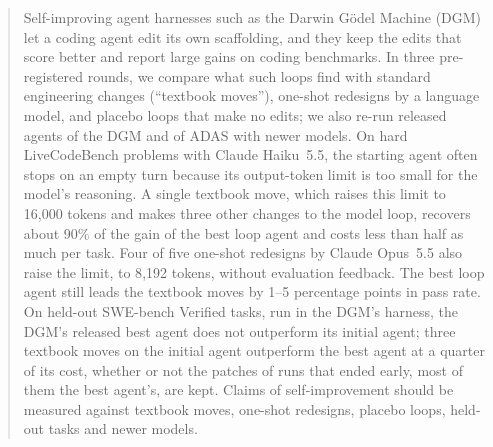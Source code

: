 \begin{abstract}
Self-improving agent harnesses such as the Darwin G\"odel Machine (DGM) let a coding agent edit its own scaffolding, and
they keep the edits that score better and report large gains on coding benchmarks. In three pre-registered rounds, we
compare what such loops find with standard engineering changes (``textbook moves''), one-shot redesigns by a language
model, and placebo loops that make no edits; we also re-run released agents of the DGM and of ADAS with newer
models. On hard LiveCodeBench problems with Claude Haiku~5.5, the starting agent often stops on an empty turn because its
output-token limit is too small for the model's reasoning. A single textbook move, which raises this limit to 16{,}000 tokens
and makes three other changes to the model loop, recovers about 90\% of the gain of the best loop agent and costs less than
half as much per task. Four of five one-shot redesigns by Claude Opus~5.5 also raise the limit, to 8{,}192 tokens, without
evaluation feedback. The best loop agent still leads the textbook moves by 1--5 percentage
points in pass rate. On held-out SWE-bench Verified tasks, run in the DGM's harness, the DGM's released best agent does not outperform
its initial agent; three textbook moves on the initial agent outperform the best agent at a quarter of its cost, whether
or not the patches of runs that ended early, most of them the best agent's, are kept. Claims of self-improvement should be measured against
textbook moves, one-shot redesigns, placebo loops, held-out tasks and newer models.
\end{abstract}

